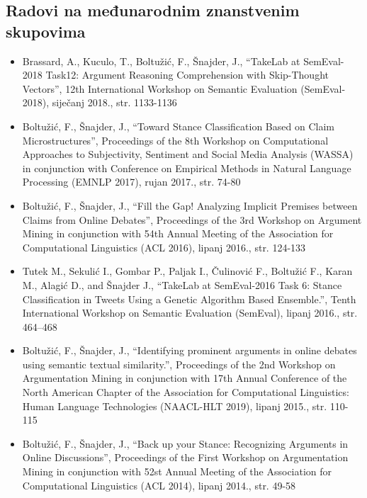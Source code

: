 \subsection*{Radovi na međunarodnim znanstvenim skupovima}

\begin{itemize}

\item Brassard, A., Kuculo, T., Boltužić, F., Šnajder, J., 
``TakeLab at SemEval-2018 Task12: Argument Reasoning Comprehension with Skip-Thought Vectors'',
12th International Workshop on Semantic Evaluation (SemEval-2018),
siječanj 2018., str. 1133-1136
\item Boltužić, F., Šnajder, J., 
``Toward Stance Classification Based on Claim Microstructures'',
Proceedings of the 8th Workshop on Computational Approaches to Subjectivity,
Sentiment and Social Media Analysis (WASSA) in conjunction with 
Conference on Empirical Methods in Natural Language Processing (EMNLP 2017),
rujan 2017., str. 74-80
\item Boltužić, F., Šnajder, J., 
``Fill the Gap! Analyzing Implicit Premises between Claims from Online Debates'',
Proceedings of the 3rd Workshop on Argument Mining in conjunction 
with 54th Annual Meeting of the Association for Computational Linguistics (ACL 2016),
lipanj 2016., str. 124-133
\item Tutek M., Sekulić I., Gombar P., Paljak I., Čulinović F., Boltužić
F., Karan M., Alagić D., and Šnajder J., ``TakeLab at
SemEval-2016 Task 6: Stance Classification in Tweets Using a
Genetic Algorithm Based Ensemble.'', Tenth International
Workshop on Semantic Evaluation (SemEval), lipanj 2016., str. 464–468
\item Boltužić, F., Šnajder, J.,
``Identifying prominent arguments in online debates using semantic textual similarity.'',
Proceedings of the 2nd Workshop on Argumentation Mining in conjunction
with 17th Annual Conference of the North American Chapter of the Association for
Computational Linguistics: Human Language Technologies
(NAACL-HLT 2019), lipanj 2015., str. 110-115
\item Boltužić, F., Šnajder, J., 
``Back up your Stance: Recognizing Arguments in Online Discussions'', 
Proceedings of the First Workshop on Argumentation Mining 
in conjunction with 52st Annual Meeting of the Association for Computational Linguistics (ACL 2014),
lipanj 2014., str. 49-58
\end{itemize}
